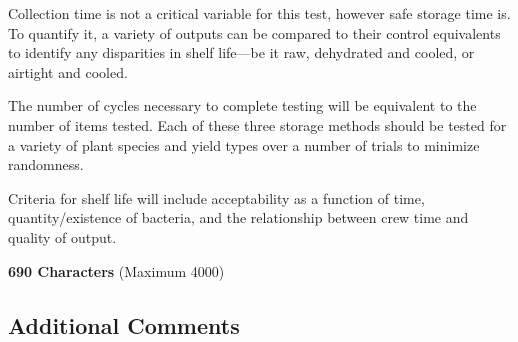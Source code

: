 Collection time is not a critical variable for this test, however safe storage time is. To quantify it, a variety of outputs can be compared to their control equivalents to identify any disparities in shelf life---be it raw, dehydrated and cooled, or airtight and cooled.

The number of cycles necessary to complete testing will be equivalent to the number of items tested. Each of these three storage methods should be tested for a variety of plant species and yield types over a number of trials to minimize randomness.

Criteria for shelf life will include acceptability as a function of time, quantity/existence of bacteria, and the relationship between crew time and quality of output.

\textbf{690 Characters} (Maximum 4000)

\clearpage

\subsection{Additional Comments}


\clearpage

